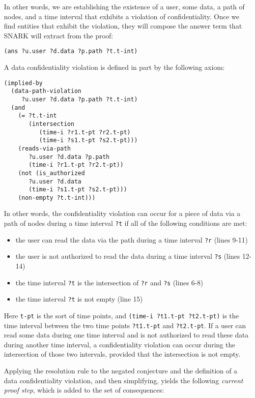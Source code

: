 In other words, we are establishing the existence of  a user, some data, a path of nodes, and a time interval that exhibits a violation of confidentiality. 
Once we find entities that exhibit the violation, they will compose the answer term that SNARK will extract from the proof:  
  \begin{lstlisting}[numbers=none] 
     (ans ?u.user ?d.data ?p.path ?t.t-int)
  \end{lstlisting}


A data confidentiality violation is defined in part by the following axiom:   
\begin{lstlisting}[]                                               
(implied-by
  (data-path-violation 
     ?u.user ?d.data ?p.path ?t.t-int)
  (and
    (= ?t.t-int
       (intersection
    	  (time-i ?r1.t-pt ?r2.t-pt)
    	  (time-i ?s1.t-pt ?s2.t-pt)))
    (reads-via-path
       ?u.user ?d.data ?p.path 
       (time-i ?r1.t-pt ?r2.t-pt))
    (not (is_authorized
       ?u.user ?d.data
       (time-i ?s1.t-pt ?s2.t-pt)))
    (non-empty ?t.t-int)))
\end{lstlisting}

In other words, the confidentiality violation can occur for a piece of data via a path of nodes during a time interval \verb'?t' if all of the following conditions are met:
\begin{itemize}
\item the user can read the data via the path during a time interval \verb'?r' (lines 9-11)
\item the user is not authorized to read the data during a time interval \verb'?s' (lines 12-14)
\item the time interval \verb'?t' is the intersection of \verb'?r' and \verb'?s' (lines 6-8)
\item the time interval \verb'?t' is not empty (line 15)
\end{itemize}

Here  \verb't-pt' is the sort of time points, and \verb'(time-i ?t1.t-pt ?t2.t-pt)' is the time interval between the two time points \verb'?t1.t-pt' and \verb'?t2.t-pt'. If a user can read some data during one time interval and is not authorized to read these data during another time interval, a confidentiality violation can occur during the intersection of those two intervals, provided that the intersection is not empty.

Applying the resolution rule to the negated conjecture and the definition of a data confidentiality violation, and then simplifying, yields the following \textit{current proof step}, which is added to the set of consequences:

